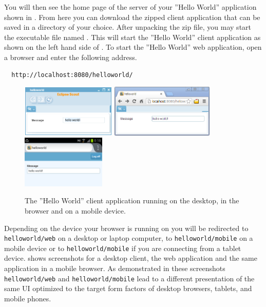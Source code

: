 \documentclass[a4paper,10pt,twoside]{book}
\begin{document}
You will then see the home page of the server of your ''Hello World'' application shown in .
From here you can download the zipped client application that can be saved in a directory of your choice.
After unpacking the zip file, you may start the executable file named .
This will start the ''Hello World'' client application as shown on the left hand side of .
To start the ''Hello World'' web application, open a browser and enter the following address.

\begin{lstlisting}
  http://localhost:8080/helloworld/
\end{lstlisting}

\begin{figure}
\includegraphics[height=2.5cm]{helloworld_finished_rayo_swing.png}\hspace{5mm}
\includegraphics[height=2.5cm]{helloworld_finished_rayo_rap.png}\hspace{5mm}
\includegraphics[height=2.5cm]{helloworld_finished_rayo_rap_mobile.png}
\caption{The ''Hello World'' client application running on the desktop, in the browser and on a mobile device.}
\end{figure}

Depending on the device your browser is running on you will be redirected to \texttt{helloworld/web} on a desktop or laptop computer, to \texttt{helloworld/mobile} on a mobile device or to \texttt{helloworld/mobile} if you are connecting from a tablet device.
 shows screenshots for a desktop client, the web application and the same application in a mobile browser.
As demonstrated in these screenshots \texttt{helloworld/web} and \texttt{helloworld/mobile} lead to a different presentation of the same UI optimized to the target form factors of desktop browsers, tablets, and mobile phones.
\end{document}
